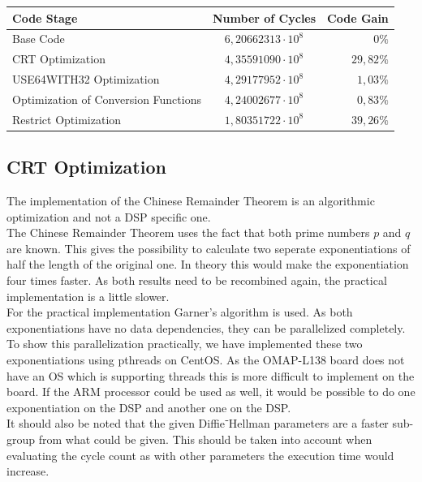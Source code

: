 \documentclass[a4paper]{article}
\begin{document}
\begin{center}
    \begin{tabular}{| l | c | r |}
        \hline
        Code Stage & Number of Cycles & Code Gain \\ \hline
        Base Code & $6,20662313 \cdot 10^{8}$ 	& $0\%$ \\
        CRT Optimization & $4,35591090 \cdot 10^{8}$ & $29,82\%$ \\
        USE64WITH32 Optimization 	& $4,29177952 \cdot 10^{8}$ & $1,03\%$ \\
        Optimization of Conversion Functions & $4,24002677 \cdot 10^{8}$ & $0,83\%$ \\
        Restrict Optimization	 & $1,80351722 \cdot 10^{8}$ & $39,26\%$ \\
        \hline
    \end{tabular}
\end{center}

\subsection{CRT Optimization}
The implementation of the Chinese Remainder Theorem is an algorithmic optimization and not a DSP specific one.\\

The Chinese Remainder Theorem uses the fact that both prime numbers $p$ and $q$ are known. This gives the possibility to calculate two seperate exponentiations of half the length of the original one. In theory this would make the exponentiation four times faster. As both results need to be recombined again, the practical implementation is a little slower.\\

For the practical implementation Garner's algorithm is used. As both exponentiations have no data dependencies, they can be parallelized completely. To show this parallelization practically, we have implemented these two exponentiations using pthreads on CentOS. As the OMAP-L138 board does not have an OS which is supporting threads this is more difficult to implement on the board. If the ARM processor could be used as well, it would be possible to do one exponentiation on the DSP and another one on the DSP. \\

It should also be noted that the given Diffie⁻Hellman parameters are a faster sub-group from what could be given. This should be taken into account when evaluating the cycle count as with other parameters the execution time would increase.
\end{document}
